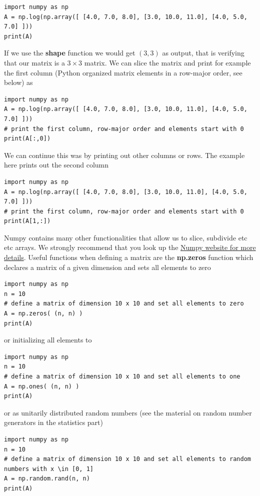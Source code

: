 \documentclass[%
oneside,                 %
final,                   %
10pt]{article}
\begin{document}
\begin{verbatim}
import numpy as np
A = np.log(np.array([ [4.0, 7.0, 8.0], [3.0, 10.0, 11.0], [4.0, 5.0, 7.0] ]))
print(A)
\end{verbatim}
If we use the \textbf{shape} function we would get $(3, 3)$ as output, that is verifying that our matrix is a $3\times 3$ matrix. We can slice the matrix and print for example the first column (Python organized matrix elements in a row-major order, see below) as
\begin{verbatim}
import numpy as np
A = np.log(np.array([ [4.0, 7.0, 8.0], [3.0, 10.0, 11.0], [4.0, 5.0, 7.0] ]))
# print the first column, row-major order and elements start with 0
print(A[:,0]) 
\end{verbatim}
We can continue this was by printing out other columns or rows. The example here prints out the second column
\begin{verbatim}
import numpy as np
A = np.log(np.array([ [4.0, 7.0, 8.0], [3.0, 10.0, 11.0], [4.0, 5.0, 7.0] ]))
# print the first column, row-major order and elements start with 0
print(A[1,:]) 
\end{verbatim}
Numpy contains many other functionalities that allow us to slice, subdivide etc etc arrays. We strongly recommend that you look up the \href{{http://www.numpy.org/}}{Numpy website for more details}. Useful functions when defining a matrix are the \textbf{np.zeros} function which declares a matrix of a given dimension and sets all elements to zero
\begin{verbatim}
import numpy as np
n = 10
# define a matrix of dimension 10 x 10 and set all elements to zero
A = np.zeros( (n, n) )
print(A) 
\end{verbatim}
or initializing all elements to 
\begin{verbatim}
import numpy as np
n = 10
# define a matrix of dimension 10 x 10 and set all elements to one
A = np.ones( (n, n) )
print(A) 
\end{verbatim}
or as unitarily distributed random numbers (see the material on random number generators in the statistics part)
\begin{verbatim}
import numpy as np
n = 10
# define a matrix of dimension 10 x 10 and set all elements to random numbers with x \in [0, 1]
A = np.random.rand(n, n)
print(A) 
\end{verbatim}
\end{document}
